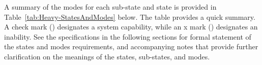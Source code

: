 A summary of the modes for each sub-state and state is provided in Table~\ref{tab:Heavy-StatesAndModes} below.
The table provides a quick summary. A check mark (\cmark) designates a system capability, while an x mark (\xmark) designates an inability.
See the specifications in the following sections for formal statement of the states and modes requirements, and accompanying notes that provide further clarification on the meanings of the states, sub-states, and modes.

